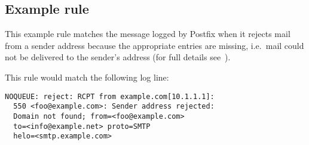 \documentclass[a4paper,12pt,draft]{article}
\begin{document}
\subsection{Example rule}

This example rule matches the message logged by Postfix when it rejects
mail from a sender address because the appropriate \DNS{} entries are
missing, i.e.\ mail could not be delivered to the sender's address (for
full details see~\cite{reject-unknown-sender-domain}).

This rule would match the following log line:

\begin{verbatim}
NOQUEUE: reject: RCPT from example.com[10.1.1.1]: 
  550 <foo@example.com>: Sender address rejected:
  Domain not found; from=<foo@example.com>
  to=<info@example.net> proto=SMTP
  helo=<smtp.example.com>
\end{verbatim}
\end{document}
